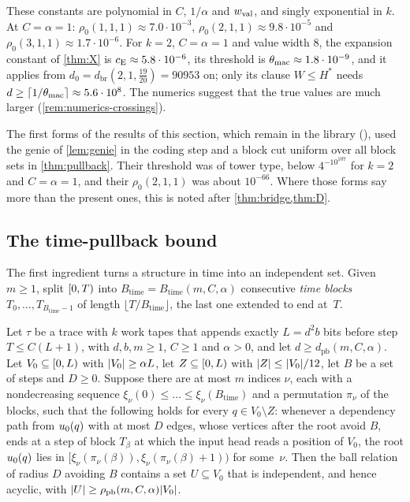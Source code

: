 These constants are polynomial in $C$, $1/\alpha$ and $w_{\mathrm{val}}$, and singly exponential in $k$. At $C=\alpha=1$:
$\rho_0(1,1,1)\approx7.0\cdot10^{-3}$, $\rho_0(2,1,1)\approx9.8\cdot10^{-5}$ and $\rho_0(3,1,1)\approx1.7\cdot10^{-6}$. For $k=2$,
$C=\alpha=1$ and value width $8$, the expansion constant of \cref{thm:X} is $c_{\mathrm{E}}\approx5.8\cdot10^{-6}$, its threshold is
$\theta_{\mathrm{mac}}\approx1.8\cdot10^{-9}$, and it applies from $d_0=d_{\mathrm{br}}(2,1,\frac{19}{20})=90953$ on; only its clause $W\le H^*$
needs $d\ge\lceil1/\theta_{\mathrm{mac}}\rceil\approx5.6\cdot10^8$. The numerics suggest that the true values are much
larger (\cref{rem:numerics-crossings}).

The first forms of the results of this section, which remain in the library (), used the genie of \cref{lem:genie} in the coding step
and a block cut uniform over all block sets in \cref{thm:pullback}. Their threshold was of tower type, below $4^{-10^{107}}$ for $k=2$
and $C=\alpha=1$, and their $\rho_0(2,1,1)$ was about $10^{-66}$. Where those forms say more than the present ones, this is noted after
\cref{thm:bridge,thm:D}.

\subsection{The time-pullback bound}

The first ingredient turns a structure in time into an independent set. Given $m\ge1$, split $[0,T)$ into
$B_{\mathrm{time}}=B_{\mathrm{time}}(m,C,\alpha)$ consecutive \emph{time blocks} $T_0,\dots,T_{B_{\mathrm{time}}-1}$ of length
$\lfloor T/B_{\mathrm{time}}\rfloor$, the last one extended to end at~$T$.

\begin{theorem}\label{thm:pullback}
Let $\tau$ be a trace with $k$ work tapes that appends exactly $L=d^2b$ bits before step $T\le C(L+1)$, with $d,b,m\ge1$, $C\ge1$ and
$\alpha>0$, and let $d\ge d_{\mathrm{pb}}(m,C,\alpha)$. Let $V_0\subseteq[0,L)$ with $\lvert V_0 \rvert\ge\alpha L$, let
$Z\subseteq[0,L)$ with $\lvert Z \rvert\le\lvert V_0 \rvert/12$, let $B$ be a set of steps and $D\ge0$. Suppose there are at most $m$ indices
$\nu$, each with a nondecreasing sequence $\xi_\nu(0)\le\dots\le\xi_\nu(B_{\mathrm{time}})$ and a permutation $\pi_\nu$ of the
blocks, such that the following holds for every $q\in V_0\setminus Z$: whenever a dependency path from $u_0(q)$ with at most $D$
edges, whose vertices after the root avoid $B$, ends at a step of block $T_\beta$ at which the input head reads a position of $V_0$,
the root $u_0(q)$ lies in $[\xi_\nu(\pi_\nu(\beta)),\xi_\nu(\pi_\nu(\beta)+1))$ for some~$\nu$. Then the ball relation of radius
$D$ avoiding $B$ contains a set $U\subseteq V_0$ that is independent, and hence acyclic, with
$\lvert U \rvert\ge\rho_{\mathrm{pb}}(m,C,\alpha)\lvert V_0 \rvert$.
\end{theorem}

